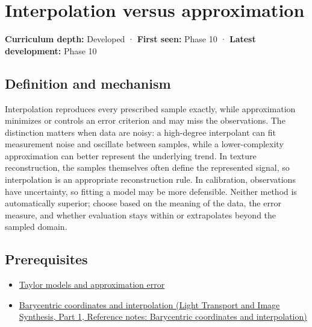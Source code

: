 \hypertarget{appendix-0c2a5f69851e}{}\label{referencestart:appendix-0c2a5f69851e}
\section{Interpolation versus approximation}\label{appendix-0c2a5f69851e-interpolation-versus-approximation}

\hypertarget{appendix-0c2a5f69851e-interpolation-versus-approximation}{}

\textbf{Curriculum depth:} Developed · \textbf{First seen:} Phase 10 · \textbf{Latest development:} Phase 10

\begin{allmightroledefinition}

\subsection{Definition and mechanism}\label{appendix-0c2a5f69851e-definition-and-mechanism}

\hypertarget{appendix-0c2a5f69851e-definition-and-mechanism}{}

Interpolation reproduces every prescribed sample exactly, while approximation minimizes or controls an error criterion and may miss the observations. The distinction matters when data are noisy: a high-degree interpolant can fit measurement noise and oscillate between samples, while a lower-complexity approximation can better represent the underlying trend. In texture reconstruction, the samples themselves often define the represented signal, so interpolation is an appropriate reconstruction rule. In calibration, observations have uncertainty, so fitting a model may be more defensible. Neither method is automatically superior; choose based on the meaning of the data, the error measure, and whether evaluation stays within or extrapolates beyond the sampled domain.

\end{allmightroledefinition}

\subsection{Prerequisites}\label{appendix-0c2a5f69851e-prerequisites}

\hypertarget{appendix-0c2a5f69851e-prerequisites}{}

\begin{itemize}
\tightlist
\item
  \hyperref[appendix-32f39e9a3738]{Taylor models and approximation error}
\item
  \href{../04-Light-Transport-and-Image-Synthesis-P01/main.pdf\#appendix-02b9d9a81dca}{Barycentric coordinates and interpolation (Light Transport and Image Synthesis, Part 1, Reference notes: Barycentric coordinates and interpolation)}
\end{itemize}

